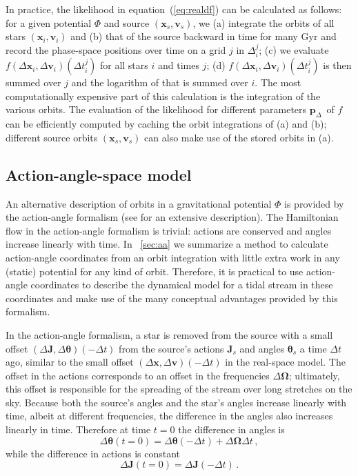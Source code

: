 \documentclass[12pt,preprint]{aastex}
\newcommand{\eqnname}{equation}
\renewcommand{\vec}[1]{\ensuremath{\mathbf{#1}}}
\newcommand{\vecx}{\ensuremath{\vec{x}}}
\newcommand{\vecv}{\ensuremath{\vec{v}}}
\newcommand{\vecj}{\ensuremath{\vec{J}}}
\newcommand{\veco}{\ensuremath{\vec{\Omega}}}
\newcommand{\veca}{\ensuremath{\boldsymbol\theta}}
\newcommand{\paramsdiff}{\ensuremath{\vec{p}_\Delta}}
\begin{document}
In practice, the likelihood in \eqnname~(\ref{eq:realdf}) can be
calculated as follows: for a given potential $\Phi$ and source
$(\vecx_s,\vecv_s)$, we (a) integrate the orbits of all stars
$(\vecx_i,\vecv_i)$ and (b) that of the source backward in time for
many Gyr and record the phase-space positions over time on a grid $j$
in $\Delta^j_i$; (c) we evaluate $f(\Delta \vecx_i,\Delta
\vecv_i)(\Delta t^j_i)$ for all stars $i$ and times $j$; (d) $f(\Delta
\vecx_i,\Delta \vecv_i)(\Delta t^j_i)$ is then summed over $j$ and the
logarithm of that is summed over $i$. The most computationally
expensive part of this calculation is the integration of the various
orbits. The evaluation of the likelihood for different parameters
\paramsdiff\ of $f$ can be efficiently computed by caching the orbit
integrations of (a) and (b); different source orbits
$(\vecx_s,\vecv_s)$ can also make use of the stored orbits in (a).

\subsection{Action-angle-space model}\label{sec:aamethod}

An alternative description of orbits in a gravitational potential
$\Phi$ is provided by the action-angle formalism (see
\citealt{binneytremaine} for an extensive description). The
Hamiltonian flow in the action-angle formalism is trivial: actions are
conserved and angles increase linearly with time. In
\appendixname~\ref{sec:aa} we summarize a method to calculate
action-angle coordinates from an orbit integration with little extra
work in any (static) potential for any kind of orbit. Therefore, it is
practical to use action-angle coordinates to describe the dynamical
model for a tidal stream in these coordinates and make use of the many
conceptual advantages provided by this formalism.

In the action-angle formalism, a star is removed from the source with
a small offset $(\Delta \vecj,\Delta \veca)(-\Delta t)$ from the
source's actions $\vecj_s$ and angles $\veca_s$ a time $\Delta t$ ago,
similar to the small offset $(\Delta \vecx,\Delta \vecv)(-\Delta t)$
in the real-space model. The offset in the actions corresponds to an
offset in the frequencies $\Delta \veco$; ultimately, this offset is
responsible for the spreading of the stream over long stretches on the
sky. Because both the source's angles and the star's angles increase
linearly with time, albeit at different frequencies, the difference in
the angles also increases linearly in time. Therefore at time $t=0$
the difference in angles is
\begin{equation}
\Delta \veca(t=0) = \Delta \veca(-\Delta t) + \Delta \veco \Delta t\,,
\end{equation}
while the difference in actions is constant
\begin{equation}
\Delta \vecj(t=0) = \Delta \vecj(-\Delta t)\,.
\end{equation}
\end{document}
